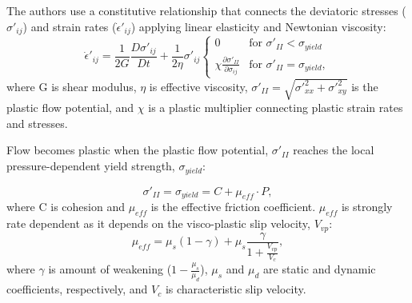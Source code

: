 \documentclass[]{proposalnsf}
\begin{document}
The authors use a constitutive relationship that connects the deviatoric stresses ($\sigma'_{ij}$) and strain rates ($\dot{\epsilon}'_{ij}$) applying linear elasticity and Newtonian viscosity:
%
\begin{equation}
  \dot\epsilon'_{ij} = \frac{1}{2G} \frac{D\sigma'_{ij}}{Dt} + \frac{1}{2\eta}\sigma'_{ij}
  \begin{cases}
        0 & \text{for $\sigma'_{II} < \sigma_{yield}$} \\
        \chi\frac{\partial\sigma'_{II}}{\partial\sigma_{ij}} & \text{for $\sigma'_{II} = \sigma_{yield}$}, 
  \end{cases}
\end{equation}
where G is shear modulus, $\eta$ is effective viscosity, $\sigma'_{II} = \sqrt{\sigma'^2_{xx} + \sigma'^2_{xy}}$ is the plastic flow potential, and $\chi$ is a plastic multiplier connecting plastic strain rates and stresses.

Flow becomes plastic when the plastic flow potential, $\sigma'_{II}$ reaches the local pressure-dependent yield strength, $\sigma_{yield}$:

\begin{equation}
	 	\sigma'_{II} = \sigma_{yield} = C + \mu_{eff} \cdot P, 
 \end{equation} 
where C is cohesion and $\mu_{eff}$ is the effective friction coefficient. $\mu_{eff}$ is strongly rate dependent as it depends on the visco-plastic slip velocity, $V_{vp}$:
\begin{equation}
 	\mu_{eff} = \mu_s(1-\gamma) + \mu_s\frac{\gamma}{1 + \frac{V_{vp}}{V_c}},
 \end{equation} 
 where  $\gamma$ is amount of weakening ($1 - \frac{\mu_s}{\mu_d}$), $\mu_s$ and $\mu_d$ are static and dynamic coefficients, respectively, and $V_c$ is characteristic slip velocity. 
\end{document}
